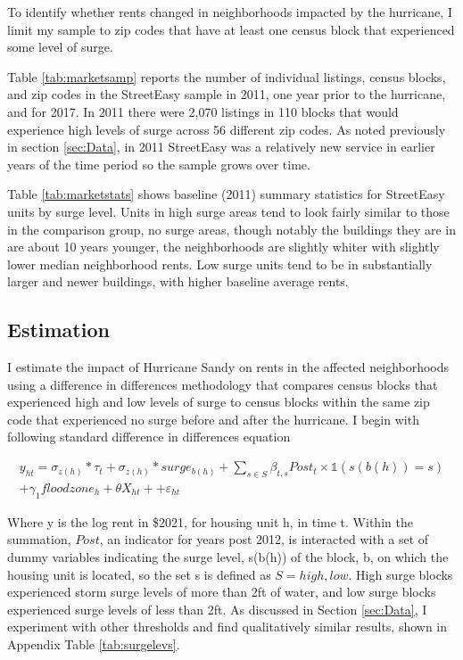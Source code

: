 \documentclass[12pt]{article}
\begin{document}
{{{{To identify whether rents changed in neighborhoods impacted by the hurricane, I limit my sample to zip codes that have at least one census block that experienced some level of surge.

Table \ref{tab:marketsamp} reports the number of individual listings, census blocks, and zip codes in the StreetEasy sample in 2011, one year prior to the hurricane, and for 2017. In 2011 there were 2,070 listings in 110 blocks that would experience high levels of surge across 56 different zip codes. As noted previously in section \ref{sec:Data}, in 2011 StreetEasy was a relatively new service in earlier years of the time period so the sample grows over time.  

Table \ref{tab:marketstats} shows baseline (2011) summary statistics for StreetEasy units by surge level.  Units in high surge areas tend to look fairly similar to those in the comparison group, no surge areas, though notably the buildings they are in are about 10 years younger, the neighborhoods are slightly whiter with slightly lower median neighborhood rents.  Low surge units tend to be in substantially larger and newer buildings, with higher baseline average rents. 


\subsection{Estimation}{\label{sec:Estimation}}
I estimate the impact of Hurricane Sandy on rents in the affected neighborhoods using a difference in differences methodology that compares census blocks that experienced high and low levels of surge to census blocks within the same zip code that experienced no surge before and after the hurricane. I begin with following standard difference in differences equation 

\begin{equation}
\label{eq:DID}
\begin{split}
y_{ht}= \sigma_{z(h)}\ast\tau_t+\sigma_{z(h)}\ast surge_{b(h)}  + \sum_{s\in S}{\beta_{t,s}Post_{t}\times \mathbb{1}}(s(b(h))=s) \\+\gamma_{1}floodzone_{h} + \theta X_{ht} + +\varepsilon_{ht}
\end{split}
\end{equation}

Where y is the log rent in \$2021, for housing unit h, in time t.   Within the summation, $Post$, an indicator for years post 2012, is interacted with a set of dummy variables indicating the surge level, s(b(h)) of the block, b, on which the housing unit is located, so the set s is defined as $S = {high, low}$. High surge blocks experienced storm surge levels of more than 2ft of water, and low surge blocks experienced surge levels of less than 2ft. As discussed in Section \ref{sec:Data}, I experiment with other thresholds and find qualitatively similar results, shown in Appendix Table \ref{tab:surgelevs}. 

}}}}
\end{document}
